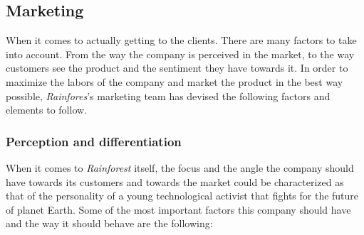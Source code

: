 \documentclass[english,runningheads,a4paper]{llncs}[2018/03/10]
\begin{document}

    \subsection*{Marketing}

    When it comes to actually getting to the clients. There are many factors to
    take into account. From the way the company is perceived in the market, to
    the way customers see the product and the sentiment they have towards it. In
    order to maximize the labors of the company and market the product in the
    best way possible, \textit{Rainfores}'s marketing team has devised the
    following factors and elements to follow.


        \subsubsection*{Perception and differentiation}

        When it comes to \textit{Rainforest} itself, the focus and the angle the
        company should have towards its customers and towards the market could
        be characterized as that of the personality of a young technological
        activist that fights for the future of planet Earth. Some of the most
        important factors this company should have and the way it should behave
        are the following:
\end{document}
